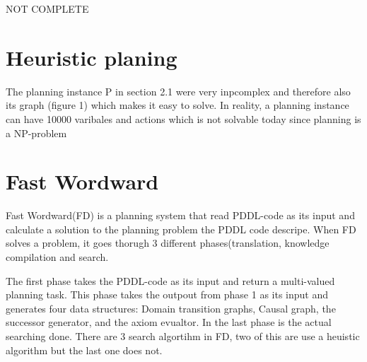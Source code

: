 \documentclass[cropmarks, frame, english]{idamasterthesis}
\begin{document}
NOT COMPLETE
\section{Heuristic planing}
The planning instance P in section 2.1 were very inpcomplex and therefore also its graph (figure 1)  which makes it easy to solve. In reality, a planning instance can have 10000 varibales and actions which is not solvable today since planning is a NP-problem

\section{Fast Wordward}
Fast Wordward(FD) is a planning system that read PDDL-code as its input and calculate a solution to the planning problem the PDDL code descripe. 
When FD solves a problem, it goes thorugh 3 different phases(translation, knowledge compilation and search. 

The first phase takes the PDDL-code as its input and return a multi-valued planning task. 
 This phase takes the outpout from phase 1 as its input and generates four data structures: Domain transition graphs, Causal graph, the successor generator, and the axiom evualtor. 
In the last phase is the actual searching done. There are 3 search algortihm in FD, two of this are use a heuistic algorithm but the last one does not. 



\cite{Backstrom2004a}
\cite{Bodlaender1993}
\cite{Helmert2006}
\cite{Hoffmann2001}



\end{document}
